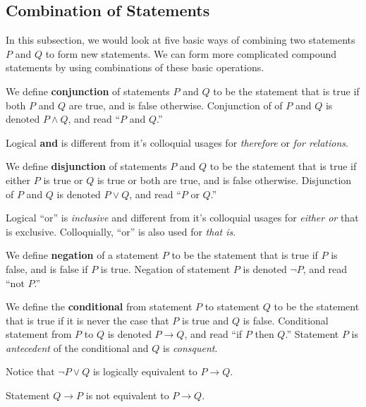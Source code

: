 \documentclass[a4paper,english,12pt]{article}
\begin{document}
\subsection{Combination of Statements }
In this subsection, we would look at five basic ways of combining two statements $P$ and $Q$ to form new statements. We can form more complicated compound statements by using combinations of these basic operations. 
\begin{defn}[Conjunction] We define \textbf{conjunction} of statements $P$ and $Q$ to be the statement that is true if both $P$ and $Q$ are true, and is false otherwise. Conjunction of of $P$ and $Q$ is denoted $P \wedge Q$, and read ``$P$ and $Q$.''
\end{defn}
\begin{rem} Logical \textbf{and} is different from it's colloquial usages for \emph{therefore} or \emph{for relations}.
\end{rem}	
\begin{defn}[Disjunction] We define \textbf{disjunction} of statements $P$ and $Q$ to be the statement that is true if either $P$ is true or $Q$ is true or both are true, and is false otherwise. Disjunction of $P$ and $Q$ is denoted $P \vee Q$, and read ``$P$ or $Q$.''
\end{defn}
\begin{rem} Logical ``or'' is \emph{inclusive} and different from it's colloquial usages for \emph{either or} that is exclusive. Colloquially, ``or'' is also used for \emph{that is}.
\end{rem}			
\begin{defn}[Negation] We define \textbf{negation} of a statement $P$ to be the statement that is true if $P$ is false, and is false if $P$ is true. Negation of statement $P$ is denoted $\neg P$, and read ``not $P$.''	
\end{defn}
\begin{defn}[Conditional] We define the \textbf{conditional} from statement $P$ to statement $Q$ to be the statement that is true if it is never the case that $P$ is true and $Q$ is false. Conditional statement from $P$ to $Q$ is denoted $P \rightarrow Q$, and read ``if $P$ then $Q$.''	Statement $P$ is \emph{antecedent} of the conditional and $Q$ is \emph{consquent}.	
\end{defn}
\begin{rem} Notice that $\neg P \vee Q$ is logically equivalent to $P \rightarrow Q$.
\end{rem}	
\begin{rem} Statement $Q \rightarrow P$ is not equivalent to $P \rightarrow Q$.
\end{rem}	
\end{document}
